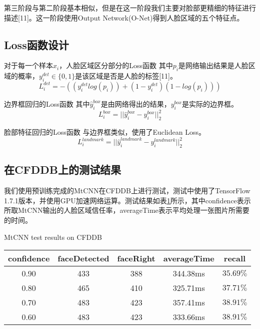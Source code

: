 第三阶段与第二阶段基本相似，但是在这一阶段我们主要对脸部更精细的特征进行描述[11]。这一阶段使用Output Network(O-Net)得到人脸区域的五个特征点。

\subsection{Loss函数设计}

对于每一个样本$x_i$，人脸区域区分部分的Loss函数 其中$p_i$是网络输出结果是人脸区域的概率，$y_i^{det}\in\{0,1\}$是该区域是否是人脸的标签[11]。
\begin{displaymath}
	L_{i}^{det}=-((y_{i}^{det}log(p_{i}))+(1-y_{i}^{det})(1-log(p_i)))
\end{displaymath}



边界框回归的Loss函数 其中$\hat{y}_i^{box}$是由网络得出的结果，$y_i^{box}$是实际的边界框。
\begin{displaymath}
	L_{i}^{box}=||{\hat{y}_i^{box}-y_i^{box}}||_2^2
\end{displaymath}



脸部特征回归的Loss函数 与边界框类似，使用了Euclidean Loss。
\begin{displaymath}
L_{i}^{landmark}=||{\hat{y}_i^{landmark}-y_i^{landmark}}||_2^2
\end{displaymath}



\subsection{在CFDDB上的测试结果}

我们使用预训练完成的MtCNN在CFDDB上进行测试，测试中使用了TensorFlow 1.7.1版本，并使用GPU加速网络运算。测试结果如表\ref{tab:mtcnn}所示，其中confidence表示所取MtCNN输出的人脸区域信任率，averageTime表示平均处理一张图片所需要的时间。

\begin{table}[!hpb]
	\centering
	{MtCNN test results on CFDDB}
	\label{tab:mtcnn}
	\begin{tabular}{ cccc | c }
		\hline
		confidence & faceDetected & faceRight & averageTime & recall\\
		\hline
		0.90 & 433 & 388 & 344.38ms & $35.69\%$\\
		0.80 & 465 & 410 & 325.71ms & $37.71\%$\\
		0.70 & 483 & 423 & 357.41ms & $38.91\%$\\
		0.60 & 483 & 423 & 333.66ms & $38.91\%$\\
		\hline
	\end{tabular}
\end{table}

